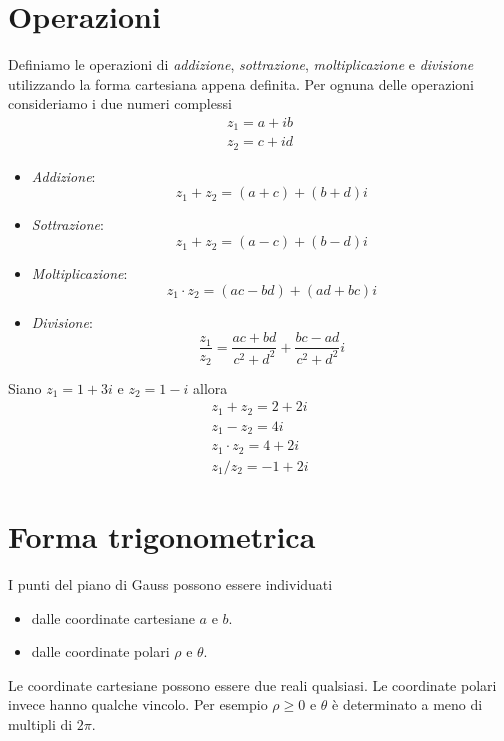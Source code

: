 \section{Operazioni}
Definiamo le operazioni di \emph{addizione}, \emph{sottrazione}, \emph{moltiplicazione} e
\emph{divisione} utilizzando la forma cartesiana appena definita.
Per ognuna delle operazioni consideriamo i due numeri complessi
\begin{gather*}
	z_1 = a + ib \\
	z_2 = c + id
\end{gather*}
\begin{itemize}
	\item \emph{Addizione}:
	      \begin{equation*}
		      z_1 + z_2 = (a + c) + (b + d)i
	      \end{equation*}
	\item \emph{Sottrazione}:
	      \begin{equation*}
		      z_1 + z_2 = (a - c) + (b - d)i
	      \end{equation*}
	\item \emph{Moltiplicazione}:
	      \begin{equation*}
		      z_1 \cdot z_2 = (ac - bd) + (ad + bc)i
	      \end{equation*}
	\item \emph{Divisione}:
	      \begin{equation*}
		      \frac{z_1}{z_2} = \frac{ac + bd}{c^2 + d^2} + \frac{bc - ad}{c^2 + d^2}i
	      \end{equation*}
\end{itemize}

\begin{example}
	Siano $z_1 = 1 + 3i$ e $z_2 = 1 - i$ allora
	\begin{gather*}
		z_1 + z_2 = 2 + 2i  \\
		z_1 - z_2 = 4i      \\
		z_1 \cdot z_2 = 4 + 2i  \\
		z_1 / z_2 = -1 + 2i
	\end{gather*}
\end{example}

\section{Forma trigonometrica}
I punti del piano di Gauss possono essere individuati
\begin{itemize}
	\item dalle coordinate cartesiane $a$ e $b$.
	\item dalle coordinate polari $\rho$ e $\theta$.
\end{itemize}
Le coordinate cartesiane possono essere due reali qualsiasi.
Le coordinate polari invece hanno qualche vincolo. Per esempio $\rho \geq 0$ e $\theta$ \`e
determinato a meno di multipli di $2 \pi$.

